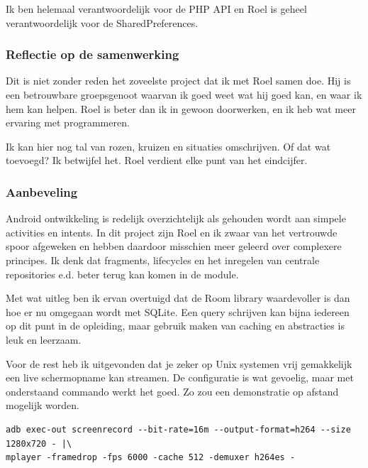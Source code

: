 \documentclass[dutch]{report}
\begin{document}
	Ik ben helemaal verantwoordelijk voor de PHP API en Roel is geheel verantwoordelijk voor de SharedPreferences. 
	\subsubsection{Reflectie op de samenwerking}
	Dit is niet zonder reden het zoveelste project dat ik met Roel samen doe. Hij is een betrouwbare groepsgenoot waarvan ik goed weet wat
	hij goed kan, en waar ik hem kan helpen. Roel is beter dan ik in gewoon doorwerken, en ik heb wat meer ervaring met programmeren.
	
	Ik kan hier nog tal van rozen, kruizen en situaties omschrijven. Of dat wat toevoegd? Ik betwijfel het. Roel verdient elke punt van 
	het eindcijfer.
	
	\subsubsection{Aanbeveling}
	Android ontwikkeling is redelijk overzichtelijk als gehouden wordt aan simpele activities en intents. In dit project zijn Roel en ik 
	zwaar van het vertrouwde spoor afgeweken en hebben daardoor misschien meer geleerd over complexere principes. Ik denk dat fragments,
	lifecycles en het inregelen van centrale repositories e.d. beter terug kan komen in de module. 
	
	Met wat uitleg ben ik ervan overtuigd dat de Room library waardevoller is dan hoe er nu omgegaan wordt met SQLite. Een query schrijven
	kan bijna iedereen op dit punt in de opleiding, maar gebruik maken van caching en abstracties is leuk en leerzaam. 
	
	Voor de rest heb ik uitgevonden dat je zeker op Unix systemen vrij gemakkelijk een live schermopname kan streamen. De configuratie is
	wat gevoelig, maar met onderstaand commando werkt het goed. Zo zou een demonstratie op afstand mogelijk worden. 

	\begin{lstlisting}
adb exec-out screenrecord --bit-rate=16m --output-format=h264 --size 1280x720 - |\
mplayer -framedrop -fps 6000 -cache 512 -demuxer h264es -
	\end{lstlisting}
\end{document}
